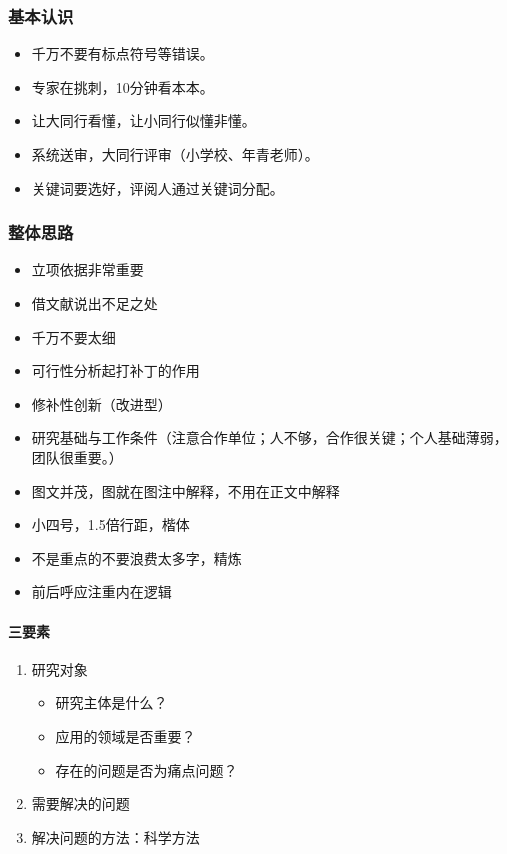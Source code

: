 \subsubsection{基本认识}
\begin{itemize}
\item 千万不要有标点符号等错误。
\item 专家在挑刺，10分钟看本本。
\item 让大同行看懂，让小同行似懂非懂。
\item 系统送审，大同行评审（小学校、年青老师）。
\item 关键词要选好，评阅人通过关键词分配。
\end{itemize}


\subsubsection{整体思路}
\begin{itemize}
\item 立项依据非常重要
\item 借文献说出不足之处
\item 千万不要太细
\item 可行性分析起打补丁的作用
\item 修补性创新（改进型）
\item 研究基础与工作条件（注意合作单位；人不够，合作很关键；个人基础薄弱，团队很重要。）
\item 图文并茂，图就在图注中解释，不用在正文中解释
\item 小四号，1.5倍行距，楷体
\item 不是重点的不要浪费太多字，精炼
\item 前后呼应注重内在逻辑
\end{itemize}


\paragraph{三要素}
\begin{enumerate}
\item 研究对象
\begin{itemize}
\item 研究主体是什么？
\item 应用的领域是否重要？
\item 存在的问题是否为痛点问题？
\end{itemize}

\item 需要解决的问题

\item 解决问题的方法：科学方法
\end{enumerate}


